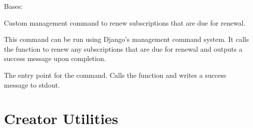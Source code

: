 \documentclass[letterpaper,10pt,english]{sphinxmanual}
\begin{document}
\begin{fulllineitems}
\label{\detokenize{modules/others:client.management.commands.renew_subscriptions.Command}}
\pysigstartsignatures
{}
\pysigstopsignatures
\sphinxAtStartPar
Bases: 

\sphinxAtStartPar
Custom management command to renew subscriptions that are due for renewal.

\sphinxAtStartPar
This command can be run using Django’s management command system. It calls
the  function to renew any subscriptions that are
due for renewal and outputs a success message upon completion.

\begin{fulllineitems}
\label{\detokenize{modules/others:client.management.commands.renew_subscriptions.Command.handle}}
\pysigstartsignatures
{}
\pysigstopsignatures
\sphinxAtStartPar
The entry point for the command. Calls the  function
and writes a success message to stdout.

\end{fulllineitems}


\end{fulllineitems}



\section{Creator Utilities}
\label{\detokenize{modules/others:module-creator.decorators}}\label{\detokenize{modules/others:creator-utilities}}
\end{document}
